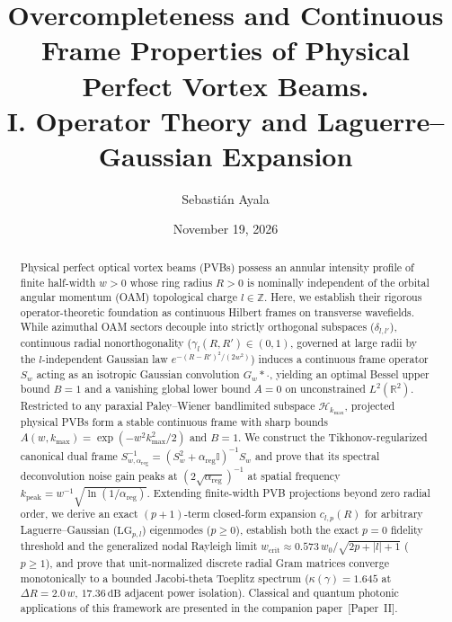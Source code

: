 \documentclass[aps,pra,reprint,nofootinbib,floatfix,longbibliography]{revtex4-2}
\theoremstyle{remark}
\newcommand{\abs}[1]{\lvert #1 \rvert}
\begin{document}
\title{Overcompleteness and Continuous Frame Properties of Physical Perfect Vortex Beams.\\I. Operator Theory and Laguerre--Gaussian Expansion}

\author{Sebasti\'an Ayala}

\date{November 19, 2026}

\begin{abstract}
Physical perfect optical vortex beams (PVBs) possess an annular intensity profile of finite half-width $w > 0$ whose ring radius $R > 0$ is nominally independent of the orbital angular momentum (OAM) topological charge $l \in \mathbb{Z}$. Here, we establish their rigorous operator-theoretic foundation as continuous Hilbert frames on transverse wavefields. While azimuthal OAM sectors decouple into strictly orthogonal subspaces ($\delta_{l,l'}$), continuous radial nonorthogonality ($\gamma_l(R,R') \in (0,1)$, governed at large radii by the $l$-independent Gaussian law $e^{-(R-R')^2/(2w^2)}$) induces a continuous frame operator $S_w$ acting as an isotropic Gaussian convolution $G_w * \cdot$, yielding an optimal Bessel upper bound $B = 1$ and a vanishing global lower bound $A = 0$ on unconstrained $L^2(\mathbb{R}^2)$. Restricted to any paraxial Paley--Wiener bandlimited subspace $\mathcal{H}_{k_{\max}}$, projected physical PVBs form a stable continuous frame with sharp bounds $A(w,k_{\max}) = \exp(-w^2 k_{\max}^2/2)$ and $B = 1$. We construct the Tikhonov-regularized canonical dual frame $S_{w,\alpha_{\mathrm{reg}}}^{-1} = (S_w^2 + \alpha_{\mathrm{reg}}\mathbb{I})^{-1}S_w$ and prove that its spectral deconvolution noise gain peaks at $(2\sqrt{\alpha_{\mathrm{reg}}})^{-1}$ at spatial frequency $k_{\mathrm{peak}} = w^{-1}\sqrt{\ln(1/\alpha_{\mathrm{reg}})}$. Extending finite-width PVB projections beyond zero radial order, we derive an exact $(p+1)$-term closed-form expansion $c_{l,p}(R)$ for arbitrary Laguerre--Gaussian ($\mathrm{LG}_{p,l}$) eigenmodes ($p \ge 0$), establish both the exact $p = 0$ fidelity threshold and the generalized nodal Rayleigh limit $w_{\mathrm{crit}} \approx 0.573\,w_0/\sqrt{2p+\abs{l}+1}$ ($p \ge 1$), and prove that unit-normalized discrete radial Gram matrices converge monotonically to a bounded Jacobi-theta Toeplitz spectrum ($\kappa(\gamma) = 1.645$ at $\Delta R = 2.0\,w$, $17.36\,\mathrm{dB}$ adjacent power isolation). Classical and quantum photonic applications of this framework are presented in the companion paper~[Paper~II].
\end{abstract}
\end{document}
